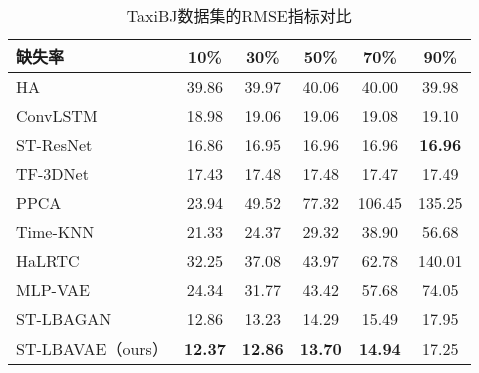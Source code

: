 %
\begin{table}[htbp] 
\caption{TaxiBJ数据集的RMSE指标对比} \label{rmse_taxibj}
\vspace{0.5em}\centering\wuhao
\begin{tabular*}{\hsize}{@{}@{\extracolsep{\fill}}lccccc@{}}
\toprule[1.5pt]
缺失率 & 10\% & 30\% & 50\% & 70\% & 90\%\\
\midrule[1pt]
HA              & 39.86 & 39.97 & 40.06 & 40.00  & 39.98  \\
ConvLSTM  & 18.98 & 19.06 & 19.06 & 19.08  & 19.10  \\
ST-ResNet & 16.86 & 16.95 & 16.96 & 16.96  & \textbf{16.96}  \\
TF-3DNet  & 17.43 & 17.48 & 17.48 & 17.47  & 17.49  \\
PPCA            & 23.94 & 49.52 & 77.32 & 106.45 & 135.25 \\
Time-KNN        & 21.33 & 24.37 & 29.32 & 38.90  & 56.68  \\
HaLRTC    & 32.25 & 37.08 & 43.97 & 62.78  & 140.01 \\
MLP-VAE   & 24.34 & 31.77 & 43.42 & 57.68  & 74.05  \\
ST-LBAGAN    & 12.86 & 13.23 & 14.29 & 15.49  & 17.95  \\
ST-LBAVAE（ours） & \textbf{12.37} & \textbf{12.86} & \textbf{13.70} & \textbf{14.94}  & 17.25 \\
\bottomrule[1.5pt]
\end{tabular*}
\end{table}

